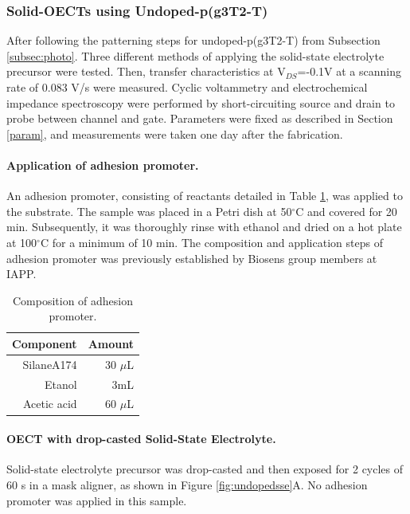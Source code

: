 \subsubsection{Solid-OECTs using Undoped-p(g3T2-T)} \label{subsec:solidOECT}
After following the patterning steps for undoped-p(g3T2-T) from Subsection \ref{subsec:photo}. Three different methods of applying the solid-state electrolyte precursor were tested. Then, transfer characteristics at V$_{DS}$=-0.1V at a scanning rate of 0.083 V/s were measured. Cyclic voltammetry and electrochemical impedance spectroscopy were performed by short-circuiting source and drain to probe between channel and gate. Parameters were fixed as described in Section \ref{param}, and measurements were taken one day after the fabrication.

\paragraph{Application of adhesion promoter.}An adhesion promoter, consisting of reactants detailed in Table \ref{tab:adprom}, was applied to the substrate. The sample was placed in a Petri dish at 50$^{\circ}$C and covered for 20 min. Subsequently, it was thoroughly rinse with ethanol and dried on a hot plate at 100$^{\circ}$C for a minimum of 10 min. The composition and application steps of adhesion promoter was previously established by Biosens group members at IAPP. 

\begin{table}[h]
	\centering
	\caption{Composition of adhesion promoter.}
	\begin{tabular}{r r} \hline
		Component   & Amount \\ \hline
		SilaneA174	& 30 $\mu$L \\ 
		Etanol   & 3mL \\ 
		Acetic acid   & 60 $\mu$L \\ \hline
	\end{tabular}
	\label{tab:adprom}
\end{table}

\paragraph{OECT with drop-casted Solid-State Electrolyte.}Solid-state electrolyte precursor was drop-casted and then exposed for 2 cycles of 60 s in a mask aligner, as shown in Figure \ref{fig:undopedsse}A. No adhesion promoter was applied in this sample.

